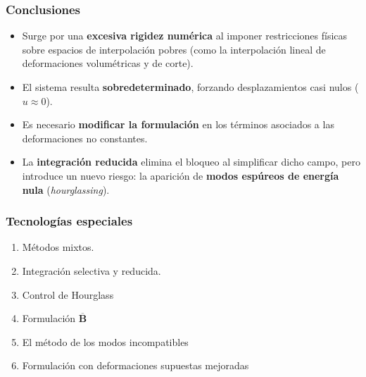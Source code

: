 \documentclass[10pt, aspectratio=43]{beamer}
\begin{document}
\begin{frame}
\frametitle{Conclusiones}
  \begin{uicard}[title=Causa fundamental del problema, top=3pt, bottom=4pt, left=8pt, right=8pt, attach title to upper={\par\vspace{0.08cm}}]
    \small
    \begin{itemize}
      \item Surge por una \textbf{excesiva rigidez numérica} al imponer restricciones físicas sobre espacios de interpolación pobres (como la interpolación lineal de deformaciones volumétricas y de corte).
      \item El sistema resulta \textbf{sobredeterminado}, forzando desplazamientos casi nulos ($u \approx 0$).
    \end{itemize}
  \end{uicard}

  \vspace{0.15cm}

  \begin{uicard}[title=Estrategia de resolución, top=3pt, bottom=4pt, left=8pt, right=8pt, attach title to upper={\par\vspace{0.08cm}}]
    \small
    \begin{itemize}
      \item Es necesario \textbf{modificar la formulación} en los términos asociados a las deformaciones no constantes.
      \item La \textbf{integración reducida} elimina el bloqueo al simplificar dicho campo, pero introduce un nuevo riesgo: la aparición de \textbf{modos espúreos de energía nula} (\emph{hourglassing}).
    \end{itemize}
  \end{uicard}
\end{frame}
\begin{frame}
\frametitle{Tecnologías especiales}
\begin{enumerate}
\item Métodos mixtos.
\item Integración selectiva y reducida.
\item Control de Hourglass
\item Formulación $\overline{\bm{B}}$
\item El método de los modos incompatibles
\item Formulación con deformaciones supuestas mejoradas
\end{enumerate}
\end{frame}
\end{document}
